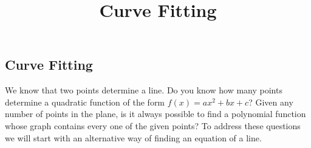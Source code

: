 \documentclass{ximera}
\title{Curve Fitting} \license{CC BY-NC-SA 4.0}
\begin{document}
\begin{abstract}
\end{abstract}
\maketitle

\begin{onlineOnly}
\section*{Curve Fitting}
\end{onlineOnly}

We know that two points determine a line.  Do you know how many points determine a quadratic function of the form $f(x)=ax^2+bx+c$?  Given any number of points in the plane, is it always possible to find a polynomial function whose graph contains every one of the given points?  To address these questions we will start with an alternative way of finding an equation of a line.
\end{document}
